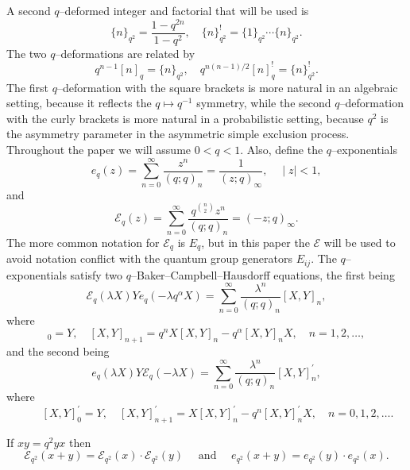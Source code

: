 \documentclass{ximera}
\begin{document}
A second $q$--deformed integer and factorial that will be used is
\begin{equation*}
\{n\}_{q^{2}}=\frac{1-q^{2 n}}{1-q^{2}}, \quad \{n\}_{q^2}^! = \{1\}_{q^2} \cdots \{n\}_{q^2}.
\end{equation*}
The two $q$--deformations are related by 
\begin{equation}\label{Relate}
q^{n-1}[n]_q = \{n\}_{q^2} , \quad q^{n(n-1)/2}[n]_q^! = \{n\}_{q^2}^!.
\end{equation}
The first $q$--deformation with the square brackets is more natural in an algebraic setting, because it reflects the $q\mapsto q^{-1}$ symmetry, while the second $q$--deformation with the curly brackets is more natural in a probabilistic setting, because $q^2$ is the asymmetry parameter in the asymmetric simple exclusion process.
Throughout the paper we will assume $0<q<1$. Also, define the $q$--exponentials
\begin{equation*}
e_{q}(z)=\sum_{n=0}^{\infty} \frac{z^{n}}{(q ; q)_{n}}=\frac{1}{(z ; q)_{\infty}}, \quad\mid z\mid<1,    
\end{equation*} 
and
\begin{equation*}
   \mathcal{E}_{q}(z)=\sum_{n=0}^{\infty} \frac{q^{\binom{n}{2}} z^{n}}{(q ; q)_{n}}=(-z ; q)_{\infty}. 
\end{equation*}
The more common notation for $\mathcal{E}_q$ is $E_q$, but in this paper the $\mathcal{E}$ will be used to avoid notation conflict with the quantum group generators $E_{ij}$. The $q$--exponentials satisfy two $q$--Baker--Campbell--Hausdorff equations, the first being
\begin{equation*}
\mathcal{E}_{q}(\lambda X) Y e_{q}\left(-\lambda q^{\alpha} X\right)=\sum_{n=0}^{\infty} \frac{\lambda^{n}}{(q ; q)_{n}}[X, Y]_{n},
\end{equation*}
where
\begin{equation*}
[X, Y]_{0}=Y, \quad[X, Y]_{n+1}=q^{n} X[X, Y]_{n}-q^{\alpha}[X, Y]_{n} X, \quad n=1,2, \ldots,
\end{equation*}
and the second being
\begin{equation}\label{SecondEq}
e_{q}(\lambda X) Y \mathcal{E}_{q}(-\lambda X)=\sum_{n=0}^{\infty} \frac{\lambda^{n}}{(q ; q)_{n}}[X, Y]_{n}^{\prime},
\end{equation}
where
$$
\qquad[X, Y]_{0}^{\prime}=Y, \quad[X, Y]_{n+1}^{\prime}=X[X, Y]_{n}^{\prime}-q^{n}[X, Y]_{n}^{\prime} X, \quad n=0,1,2, \ldots.
$$

If $xy=q^2yx$ then 
\begin{equation}\label{EFactor}
\mathcal{E}_{q^{2}}(x+y)=\mathcal{E}_{q^{2}}(x) \cdot \mathcal{E}_{q^{2}}(y) \quad \text { and } \quad e_{q^{2}}(x+y)=e_{q^{2}}(y) \cdot e_{q^{2}}(x).
\end{equation}
\end{document}
